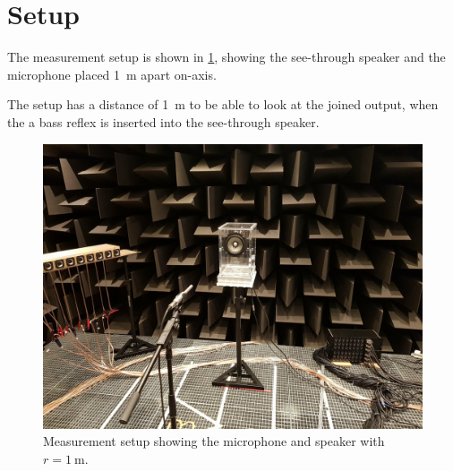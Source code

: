 \section{Setup}
The measurement setup is shown in \cref{fig:meassetup}, showing the see-through speaker and the microphone placed \SI{1}{\metre} apart on-axis.

The setup has a distance of \SI{1}{\metre} to be able to look at the joined output, when the a bass reflex is inserted into the see-through speaker.

\begin{figure}
	\centering
	\includegraphics[width=0.9\linewidth, clip, trim={5cm, 0, 5cm, 3cm}]{gfx/meas_setup.jpg}
	\caption{Measurement setup showing the microphone and speaker with $r=\SI{1}{\metre}$.}
	\label{fig:meassetup}
\end{figure}